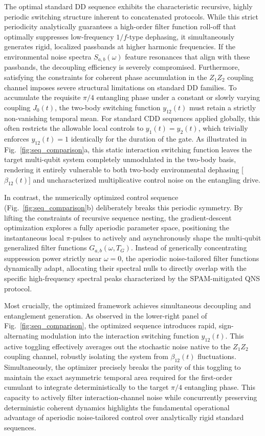 \documentclass[%
 reprint,
superscriptaddress,
 amsmath,amssymb,
 aps,
pra,
floatfix,
]{revtex4-2}
\begin{document}
The optimal standard DD sequence exhibits the characteristic recursive, highly periodic switching structure inherent to concatenated protocols. While this strict periodicity analytically guarantees a high-order filter function roll-off that optimally suppresses low-frequency $1/f$-type dephasing, it simultaneously generates rigid, localized passbands at higher harmonic frequencies. If the environmental noise spectra $S_{a,b}(\omega)$ feature resonances that align with these passbands, the decoupling efficiency is severely compromised. Furthermore, satisfying the constraints for coherent phase accumulation in the $Z_1 Z_2$ coupling channel imposes severe structural limitations on standard DD families. To accumulate the requisite $\pi/4$ entangling phase under a constant or slowly varying coupling $J_0(t)$, the two-body switching function $y_{12}(t)$ must retain a strictly non-vanishing temporal mean. For standard CDD sequences applied globally, this often restricts the allowable local controls to $y_1(t) = y_2(t)$, which trivially enforces $y_{12}(t) = 1$ identically for the duration of the gate. As illustrated in Fig.~\ref{fig:seq_comparison}a, this static interaction switching function leaves the target multi-qubit system completely unmodulated in the two-body basis, rendering it entirely vulnerable to both two-body environmental dephasing [$\beta_{12}(t)$] and uncharacterized multiplicative control noise on the entangling drive.

In contrast, the numerically optimized control sequence (Fig.~\ref{fig:seq_comparison}b) deliberately breaks this periodic symmetry. By lifting the constraints of recursive sequence nesting, the gradient-descent optimization explores a fully aperiodic parameter space, positioning the instantaneous local $\pi$-pulses to actively and asynchronously shape the multi-qubit generalized filter functions $G_{a,b}(\omega, T_G)$. Instead of generically concentrating suppression power strictly near $\omega = 0$, the aperiodic noise-tailored filter functions dynamically adapt, allocating their spectral nulls to directly overlap with the specific high-frequency spectral peaks characterized by the SPAM-mitigated QNS protocol.

Most crucially, the optimized framework achieves simultaneous decoupling and entanglement generation. As observed in the lower-right panel of Fig.~\ref{fig:seq_comparison}, the optimized sequence introduces rapid, sign-alternating modulation into the interaction switching function $y_{12}(t)$. This active toggling effectively averages out the stochastic noise native to the $Z_1 Z_2$ coupling channel, robustly isolating the system from $\beta_{12}(t)$ fluctuations. Simultaneously, the optimizer precisely breaks the parity of this toggling to maintain the exact asymmetric temporal area required for the first-order cumulant to integrate deterministically to the target $\pi/4$ entangling phase. This capacity to actively filter interaction-channel noise while concurrently preserving deterministic coherent dynamics highlights the fundamental operational advantage of aperiodic noise-tailored control over analytically rigid standard sequences.
\end{document}
